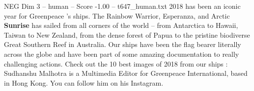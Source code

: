 \begin{textsample}{NEG Dim 3 – human – Score -1.00 – t647\_human.txt}  \label{ex:f3_neg_041}
2018 has been an iconic year for Greenpeace ’s ships.
The Rainbow Warrior, Esperanza, and Arctic \textbf{Sunrise} has sailed from all corners of the world – from Antarctica to Hawaii, Taiwan to New Zealand, from the dense forest of Papua to the pristine biodiverse Great Southern Reef in Australia.
Our ships have been the flag bearer literally across the globe and have been part of some amazing documentation to really challenging actions.
Check out the 10 best images of 2018 from our ships : Sudhanshu Malhotra is a Multimedia Editor for Greenpeace International, based in Hong Kong.
You can follow him on his Instagram.

\end{textsample}

